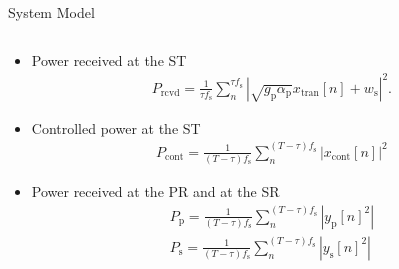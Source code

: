 \documentclass[12pt]{beamer}
\newcommand{\s}[2]{{\frac{1}{{#1}}\sum_n^{#1}} {#2}}
\newcommand{\sub}[1]{_{\text{#1}}}
\newcommand{\preg}{P\sub{cont}}
\newcommand{\xreg}{x\sub{cont}}
\newcommand{\prcvd}{P\sub{rcvd}}
\newcommand{\xtran}{x\sub{tran}}
\newcommand{\pp}{P\sub{p}}
\newcommand{\ps}{P\sub{s}}
\newcommand{\yp}{y\sub{p}}
\newcommand{\ys}{y\sub{s}}
\newcommand{\nas}{w\sub{s}}
\newcommand{\gp}{g\sub{p}}
\newcommand{\ap}{\alpha\sub{p}}
\newcommand{\fsam}{f\sub{s}}
\begin{document}
\begin{frame}{System Model}
\begin{columns}[t]
\begin{column}{0.4 \paperwidth}
\begin{itemize}
                        \item Power received at the ST 
			 \begin{align*}
				\prcvd = \s{\tau \fsam}{ |\sqrt{\gp \ap} \xtran[n] + \nas|^2}.
			\end{align*}
                        \item Controlled power at the ST
                        \begin{align*}
                        \preg = \s{(T - \tau) \fsam}{|\xreg[n]|^2}
                        \end{align*}
                        \item Power received at the PR and at the SR 
                	\begin{align*}
                       	\pp = \s{(T - \tau) \fsam}{|\yp[n]^2|} \\
			\ps = \s{(T - \tau) \fsam}{|\ys[n]^2|} 
                        \end{align*}
		\end{itemize}
                \end{column}
        \end{columns}
\end{frame}
\end{document}
